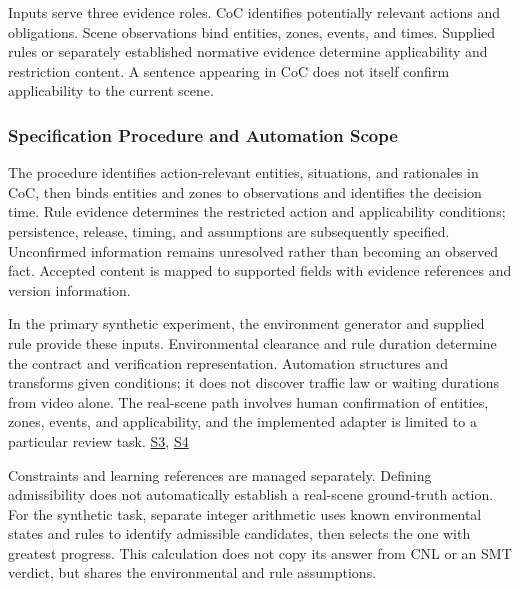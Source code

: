 \documentclass[nolineno]{ieeeaccess}
\begin{document}
Inputs serve three evidence roles. CoC identifies potentially relevant actions and obligations. Scene observations bind entities, zones, events, and times. Supplied rules or separately established normative evidence determine applicability and restriction content. A sentence appearing in CoC does not itself confirm applicability to the current scene.\par

\subsubsection{Specification Procedure and Automation Scope}

The procedure identifies action-relevant entities, situations, and rationales in CoC, then binds entities and zones to observations and identifies the decision time. Rule evidence determines the restricted action and applicability conditions; persistence, release, timing, and assumptions are subsequently specified. Unconfirmed information remains unresolved rather than becoming an observed fact. Accepted content is mapped to supported fields with evidence references and version information.\par

In the primary synthetic experiment, the environment generator and supplied rule provide these inputs. Environmental clearance and rule duration determine the contract and verification representation. Automation structures and transforms given conditions; it does not discover traffic law or waiting durations from video alone. The real-scene path involves human confirmation of entities, zones, events, and applicability, and the implemented adapter is limited to a particular review task. \href{\detokenize{/home/jinhyun/prj_ws/prj_jin/guardsynth-cc/projects/04-guardsynth-coc/experiments/paper1_cnl_learning/temporal_training_data.py}}{S3}, \href{\detokenize{/home/jinhyun/prj_ws/prj_jin/guardsynth-cc/projects/04-guardsynth-coc/src/guard_synth/qualitative_scene_contract.py}}{S4}\par

Constraints and learning references are managed separately. Defining admissibility does not automatically establish a real-scene ground-truth action. For the synthetic task, separate integer arithmetic uses known environmental states and rules to identify admissible candidates, then selects the one with greatest progress. This calculation does not copy its answer from CNL or an SMT verdict, but shares the environmental and rule assumptions.\par
\end{document}
